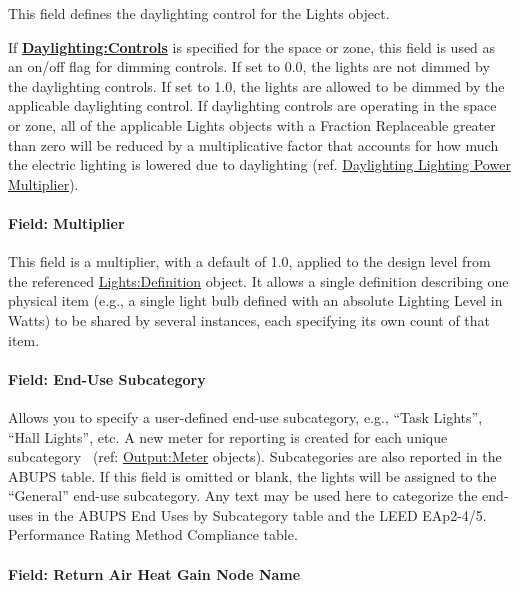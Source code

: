 This field defines the daylighting control for the Lights object.

If \textbf{\hyperref[daylightingcontrols-000]{Daylighting:Controls}} is specified for the space or zone, this field is used as an on/off flag for dimming controls. If set to 0.0, the lights are not dimmed by the daylighting controls. If set to 1.0, the lights are allowed to be dimmed by the applicable daylighting control. If daylighting controls are operating in the space or zone, all of the applicable Lights objects with a Fraction Replaceable greater than zero will be reduced by a multiplicative factor that accounts for how much the electric lighting is lowered due to daylighting (ref. \hyperref[daylighting-lighting-power-multiplier-1]{Daylighting Lighting Power Multiplier}).

\paragraph{Field: Multiplier}\label{field-multiplier-lightsinstance}

This field is a multiplier, with a default of 1.0, applied to the design level from the referenced \hyperref[lightsdefinition]{Lights:Definition} object. It allows a single definition describing one physical item (e.g., a single light bulb defined with an absolute Lighting Level in Watts) to be shared by several instances, each specifying its own count of that item.

\paragraph{Field: End-Use Subcategory}\label{field-end-use-subcategory-002-lights-instance}

Allows you to specify a user-defined end-use subcategory, e.g., ``Task Lights'', ``Hall Lights'', etc. A new meter for reporting is created for each unique subcategory~ (ref: \hyperref[outputmeter-and-outputmetermeterfileonly]{Output:Meter} objects). Subcategories are also reported in the ABUPS table. If this field is omitted or blank, the lights will be assigned to the ``General'' end-use subcategory. Any text may be used here to categorize the end-uses in the ABUPS End Uses by Subcategory table and the LEED EAp2-4/5. Performance Rating Method Compliance table.

\paragraph{Field: Return Air Heat Gain Node Name}\label{field-return-air-heat-gain-node-name-lights-instance}

